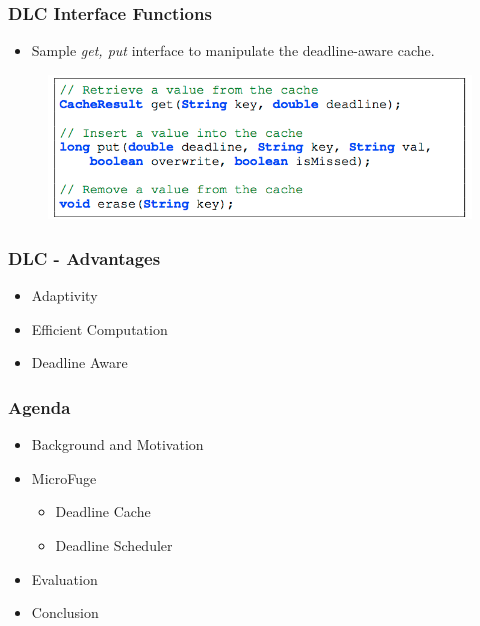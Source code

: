 \documentclass{beamer}
\begin{document}
\begin{frame}
  \frametitle{DLC Interface Functions}
  \begin{itemize}
  \item Sample \textit{get, put} interface to manipulate the deadline-aware cache.
  \end{itemize}
  \begin{figure}
    \begin{center}
      \centerline{\includegraphics[scale=0.45]{img/DLC_interface.png}}
    \end{center}
  \end{figure}
\end{frame}

\begin{frame}
  \frametitle{DLC - Advantages}
  \begin{itemize}
  \item Adaptivity
  \item Efficient Computation
  \item Deadline Aware
  \end{itemize}
\end{frame}

\begin{frame}
  \frametitle{Agenda}
  \begin{itemize}
  \item[\Checkmark] Background and Motivation
  \item[\Checkmark] MicroFuge
    \begin{itemize}
    \item[\Checkmark] Deadline Cache
    \item Deadline Scheduler
    \end{itemize}
  \item Evaluation
  \item Conclusion
  \end{itemize}
\end{frame}
\end{document}
